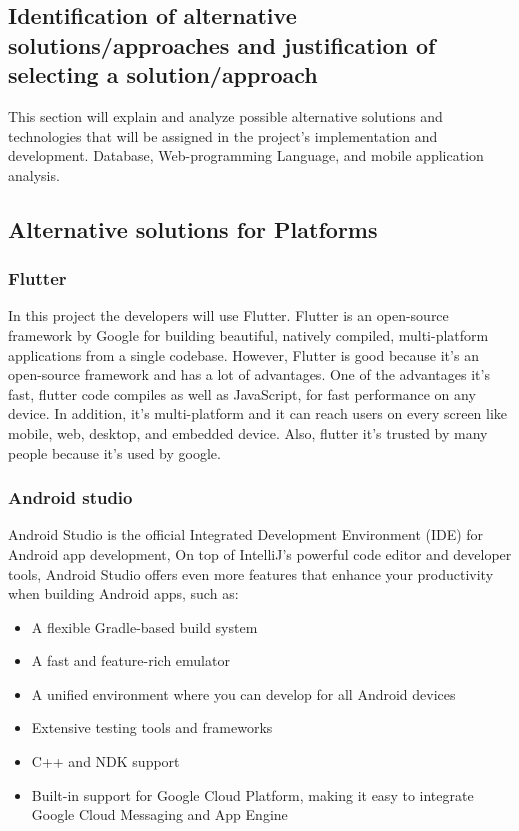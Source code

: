 \documentclass[11pt]{article}
\newcommand\tab[1][1cm]{\hspace*{#1}}
\begin{document}
\newpage
\begin{center}
\section{ Identification of alternative solutions/approaches and justification of selecting a solution/approach}
\end{center}



\tab This section will explain and analyze possible alternative solutions and technologies that will be assigned in the project's implementation and development. Database, Web-programming Language, and mobile application analysis.

\subsection{Alternative solutions for Platforms}

\subsubsection{Flutter}

\tab In this project the developers will use Flutter. Flutter is an open-source framework by Google for building beautiful, natively compiled, multi-platform applications from a single codebase. However, Flutter is good because it's an open-source framework and has a lot of advantages. One of the advantages it’s fast, flutter code compiles as well as JavaScript, for fast performance on any device. In addition, it’s multi-platform and it can reach users on every screen like mobile, web, desktop, and embedded device. Also, flutter it’s trusted by many people because it’s used by google. 
\subsubsection{Android studio}
\tab Android Studio is the official Integrated Development Environment (IDE) for Android app development, On top of IntelliJ's  powerful code editor and developer tools, Android Studio offers even more features that enhance your productivity when building Android apps, such as:

\begin{itemize}
\item A flexible Gradle-based build system
\item A fast and feature-rich emulator
\item A unified environment where you can develop for all Android devices
\item Extensive testing tools and frameworks
\item C++ and NDK support
\item Built-in support for Google Cloud Platform, making it easy to integrate Google Cloud Messaging and App Engine
\end{itemize}
\end{document}

